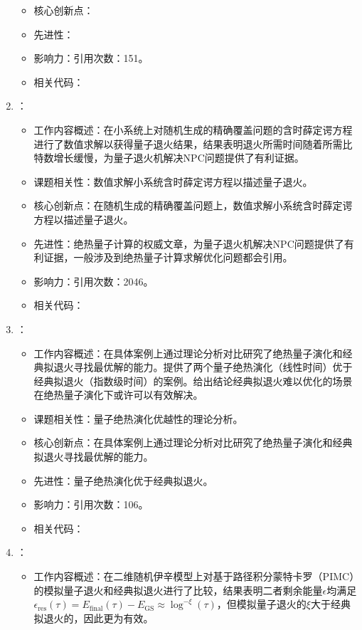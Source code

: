 \begin{enumerate}
\begin{itemize}
                \item 核心创新点：
                \item 先进性：
                \item 影响力：引用次数：151。
                \item 相关代码：
            \end{itemize}
        \item \citet{farhi2001quantum}：
        \begin{itemize}
            \item 工作内容概述：在小系统上对随机生成的精确覆盖问题的含时薛定谔方程进行了数值求解以获得量子退火结果，结果表明退火所需时间随着所需比特数增长缓慢，为量子退火机解决NPC问题提供了有利证据。
            \item 课题相关性：数值求解小系统含时薛定谔方程以描述量子退火。
            \item 核心创新点：在随机生成的精确覆盖问题上，数值求解小系统含时薛定谔方程以描述量子退火。
            \item 先进性：绝热量子计算的权威文章，为量子退火机解决NPC问题提供了有利证据，一般涉及到绝热量子计算求解优化问题都会引用。
            \item 影响力：引用次数：2046。
            \item 相关代码：
        \end{itemize}
        \item \citet{farhi2002quantum}：
            \begin{itemize}
                \item 工作内容概述：在具体案例上通过理论分析对比研究了绝热量子演化和经典拟退火寻找最优解的能力。提供了两个量子绝热演化（线性时间）优于经典拟退火（指数级时间）的案例。给出结论经典拟退火难以优化的场景在绝热量子演化下或许可以有效解决。
                \item 课题相关性：量子绝热演化优越性的理论分析。
                \item 核心创新点：在具体案例上通过理论分析对比研究了绝热量子演化和经典拟退火寻找最优解的能力。
                \item 先进性：量子绝热演化优于经典拟退火。
                \item 影响力：引用次数：106。
                \item 相关代码：
            \end{itemize}
        \item \citet{santoro2002theory}：
            \begin{itemize}
                \item 工作内容概述：在二维随机伊辛模型上对基于路径积分蒙特卡罗（PIMC）的模拟量子退火和经典拟退火进行了比较，结果表明二者剩余能量$\epsilon$均满足$\epsilon_{\text{res}}(\tau)=E_{\text{final}}(\tau)-E_{\text{GS}}\approx\log^{-\xi}(\tau)$，但模拟量子退火的$\xi$大于经典拟退火的，因此更为有效。

\end{itemize}
\end{enumerate}
